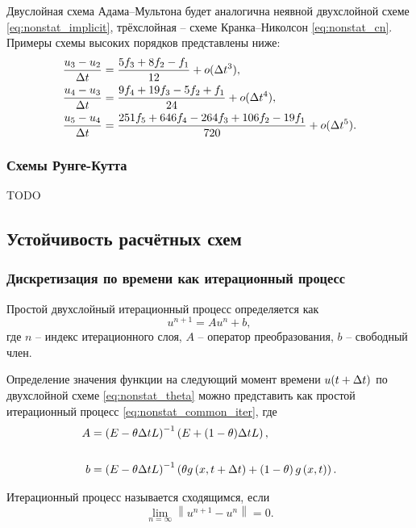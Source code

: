 Двуслойная схема Адама--Мультона будет аналогична неявной двухслойной схеме \cref{eq:nonstat_implicit},
трёхслойная -- схеме Кранка--Николсон \cref{eq:nonstat_cn}. Примеры схемы высоких порядков представлены ниже:
\begin{align*}
&\frac{u_3 - u_2}{\Delta t} = \frac{5f_3 +  8 f_2 - f_1}{12} + o(\Delta t^3),\\
&\frac{u_4 - u_3}{\Delta t} = \frac{9 f_4 + 19 f_3 - 5 f_2 + f_1}{24} + o(\Delta t^4),\\
&\frac{u_5 - u_4}{\Delta t} = \frac{251 f_5 + 646 f_4 - 264 f_3 + 106 f_2 - 19 f_1}{720} + o(\Delta t^5).
\end{align*}

\subsubsection{Схемы Рунге-Кутта}
TODO

\subsection{Устойчивость расчётных схем}
\label{sec:stability_analysis}

\subsubsection{Дискретизация по времени как итерационный процесс}


Простой двухслойный итерационный процесс определяется как
\begin{equation}
    \label{eq:nonstat_common_iter}
    u^{n+1} = A u^{n} + b,
\end{equation}
где $n$ -- индекс итерационного слоя,
$A$ -- оператор преобразования,
$b$ -- свободный член.

Определение значения функции на следующий момент времени $u(t+\Delta t)$ 
по двухслойной схеме \eqref{eq:nonstat_theta} можно представить как простой итерационный процесс \eqref{eq:nonstat_common_iter}, где
\begin{align*}
    A &= \left(E - \theta \Delta t L \right)^{-1} \left(E + (1 - \theta) \Delta t L \right), \\\\
    b &= \left(E - \theta \Delta t L \right)^{-1} \left( \theta g\left(x, t + \Delta t\right) + \left(1 - \theta\right) g\left(x, t\right) \right).
\end{align*}

Итерационный процесс называется сходящимся, если
\begin{equation*}
    \lim_{n=\infty} \left\lVert u^{n+1} - u^{n} \right\rVert = 0.
\end{equation*}

